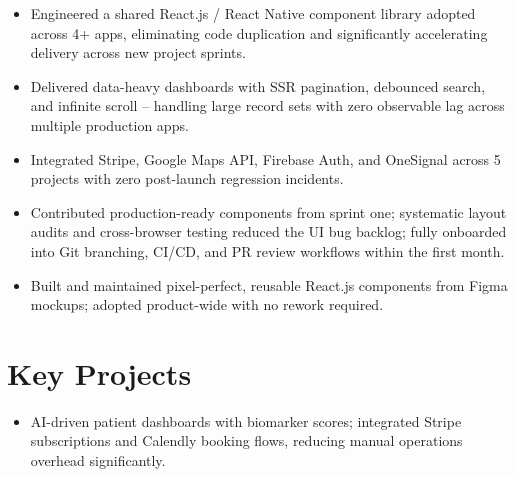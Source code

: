 \documentclass{resume}
\begin{document}
\vspace{1pt}

\begin{itemize}
  \item Engineered a shared React.js / React Native component library adopted across 4+ apps, eliminating code duplication and significantly accelerating delivery across new project sprints.
  \item Delivered data-heavy dashboards with SSR pagination, debounced search, and infinite scroll -- handling large record sets with zero observable lag across multiple production apps.
  \item Integrated Stripe, Google Maps API, Firebase Auth, and OneSignal across 5 projects with zero post-launch regression incidents.
\end{itemize}

\vspace{1pt}

\begin{itemize}
  \item Contributed production-ready components from sprint one; systematic layout audits and cross-browser testing reduced the UI bug backlog; fully onboarded into Git branching, CI/CD, and PR review workflows within the first month.
\end{itemize}

\vspace{2pt}


\begin{itemize}
  \item Built and maintained pixel-perfect, reusable React.js components from Figma mockups; adopted product-wide with no rework required.
\end{itemize}

\section{Key Projects}

\begin{itemize}
  \item AI-driven patient dashboards with biomarker scores; integrated Stripe subscriptions and Calendly booking flows, reducing manual operations overhead significantly.
\end{itemize}
\end{document}
